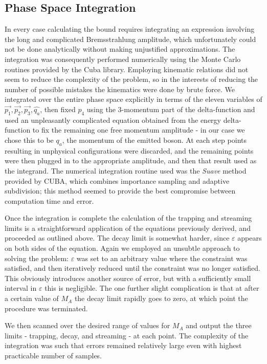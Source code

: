 \documentclass[nofootinbib,prd,superscriptaddress,twocolumn]{revtex4}
\begin{document}
	
	
\subsection{Phase Space Integration}
In every case calculating the bound requires integrating an expression involving the long and complicated Bremsstrahlung amplitude, which unfortunately could not be done analytically without making unjustified approximations. The integration was consequently performed numerically using the Monte Carlo routines provided by the Cuba library. Employing kinematic relations did not seem to reduce the complexity of the problem, so in the interests of reducing the number of possible mistakes the kinematics were done by brute force. We integrated over the entire phase space explicitly in terms of the eleven variables of $ \vec{p_1}, \vec{p_2}, \vec{p_3}, \hat{q_a} $, then fixed $ p_4 $ using the 3-momentum part of the delta-function and used an unpleasantly complicated equation obtained from the energy delta-function to fix the remaining one free momentum amplitude - in our case we chose this to be $ q_a $, the momentum of the emitted boson. At each step points resulting in unphysical configurations were discarded, and the remaining points were then plugged in to the appropriate amplitude, and then that result used as the integrand. The numerical integration routine used was the \textit{Suave} method provided by CUBA, which combines importance sampling and adaptive subdivision; this method seemed to provide the best compromise between computation time and error. 
	
Once the integration is complete the calculation of the trapping and streaming limits is a straightforward application of the equations previously derived, and proceeded as outlined above. The decay limit is somewhat harder, since $ \varepsilon $ appears on both sides of the equation. Again we employed an unsubtle approach to solving the problem: $ \varepsilon $ was set to an arbitrary value where the constraint was satisfied, and then iteratively reduced until the constraint was no longer satisfied. This obviously introduces another source of error, but with a sufficiently small interval in $ \varepsilon $ this is negligible. The one further slight complication is that at after a certain value of $ M_A $ the decay limit rapidly goes to zero, at which point the procedure was terminated.
	
We then scanned over the desired range of values for $ M_A $ and output the three limits - trapping, decay, and streaming - at each point. The complexity of the integration was such that errors remained relatively large even with highest practicable number of samples.
\end{document}
